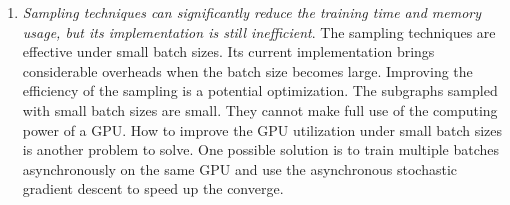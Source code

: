 \begin{enumerate}
    \item \emph{Sampling techniques can significantly reduce the training time and memory usage, but its implementation is still inefficient}.
          The sampling techniques are effective under small batch sizes.
          Its current implementation brings considerable overheads when the batch size becomes large.
          Improving the efficiency of the sampling is a potential optimization.
          The subgraphs sampled with small batch sizes are small.
          They cannot make full use of the computing power of a GPU.
          How to improve the GPU utilization under small batch sizes is another problem to solve.
          One possible solution is to train multiple batches asynchronously on the same GPU and use the asynchronous stochastic gradient descent to speed up the converge.

\end{enumerate}
